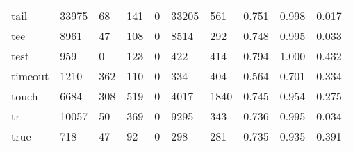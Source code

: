 \begin{longtable}{lp{1.3cm}p{1.3cm}p{1.3cm}p{1.3cm}p{1.3cm}p{1.3cm}p{1.3cm}p{1.3cm}p{1.3cm}}
tail      &                  33975 &                                 68 &                               141 &                                0 &                             33205 &                             561 &                                0.751 &                                  0.998 &                                0.017 \\
tee       &                   8961 &                                 47 &                               108 &                                0 &                              8514 &                             292 &                                0.748 &                                  0.995 &                                0.033 \\
test      &                    959 &                                  0 &                               123 &                                0 &                               422 &                             414 &                                0.794 &                                  1.000 &                                0.432 \\
timeout   &                   1210 &                                362 &                               110 &                                0 &                               334 &                             404 &                                0.564 &                                  0.701 &                                0.334 \\
touch     &                   6684 &                                308 &                               519 &                                0 &                              4017 &                            1840 &                                0.745 &                                  0.954 &                                0.275 \\
tr        &                  10057 &                                 50 &                               369 &                                0 &                              9295 &                             343 &                                0.736 &                                  0.995 &                                0.034 \\
true      &                    718 &                                 47 &                                92 &                                0 &                               298 &                             281 &                                0.735 &                                  0.935 &                                0.391 \\

\end{longtable}
